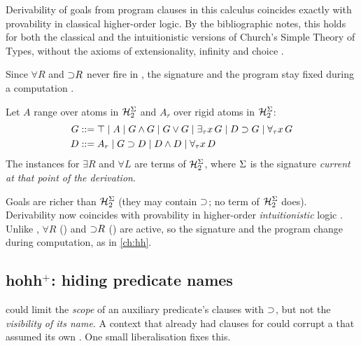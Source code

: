 \begin{theorem}\label{thm:hoprog-hohc}
Derivability of goals from program clauses in this calculus coincides exactly with provability in
classical higher-order logic. By the bibliographic notes, this holds for both the classical and the
intuitionistic versions of Church's Simple Theory of Types, without the axioms of extensionality,
infinity and choice \cite{NadathurMiller1990}.
\end{theorem}

Since $\forall R$ and ${\supset}R$ never fire in \hohc{}, the signature and the program stay fixed during a
computation .

\begin{definition}\label{def:hoprog-hohh}
Let $A$ range over atoms in $\mathcal{H}_2^\Sigma$ and $A_r$ over rigid atoms in $\mathcal{H}_2^\Sigma$:
\begin{align*}
G &::= \top \mid A \mid G\wedge G \mid G\vee G \mid \exists_\tau x\,G \mid D\supset G \mid \forall_\tau x\,G\\
D &::= A_r \mid G\supset D \mid D\wedge D \mid \forall_\tau x\,D
\end{align*}
The instances for $\exists R$ and $\forall L$ are terms of $\mathcal{H}_2^\Sigma$, where $\Sigma$ is the
signature \emph{current at that point of the derivation}.
\end{definition}

Goals are richer than $\mathcal{H}_2^\Sigma$ (they may contain $\supset$; no term of $\mathcal{H}_2^\Sigma$ does).
Derivability now coincides with provability in higher-order \emph{intuitionistic}
logic \cite{MillerNadathurPfenningScedrov1991} . Unlike \hohc{}, $\forall R$
() and ${\supset}R$ () are active, so the signature and the program change
during computation, as in \cref{ch:hh}.

\subsection{\texorpdfstring{hohh$^+$}{hohh+}: hiding predicate names}\label{sec:hoprog-hohhplus}

 could limit the \emph{scope} of an auxiliary predicate's clauses with $\supset$, but not the
\emph{visibility of its name}. A context that already had clauses for  could corrupt a
 that assumed its own . One small liberalisation fixes this.

